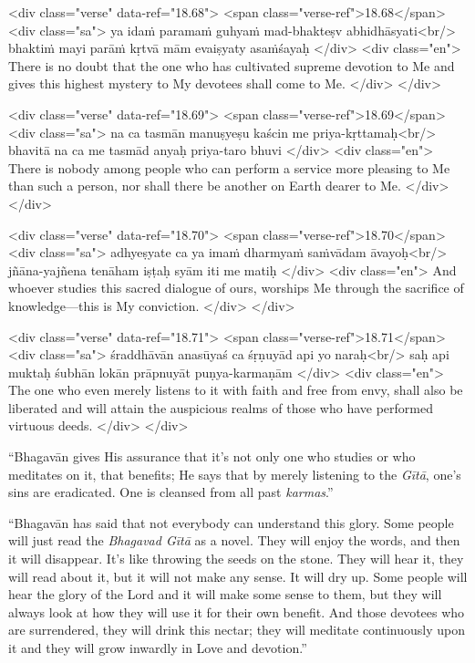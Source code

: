 \begin{html}
<div class="verse" data-ref="18.68">
  <span class="verse-ref">18.68</span>
  <div class="sa">
    ya idaṁ paramaṁ guhyaṁ mad-bhakteṣv abhidhāsyati<br/>
    bhaktiṁ mayi parāṁ kṛtvā mām evaiṣyaty asaṁśayaḥ
  </div>
  <div class="en">
    There is no doubt that the one who has cultivated supreme devotion to Me and gives this highest mystery to My devotees shall come to Me.
  </div>
</div>
\end{html}



\begin{html}
<div class="verse" data-ref="18.69">
  <span class="verse-ref">18.69</span>
  <div class="sa">
    na ca tasmān manuṣyeṣu kaścin me priya-kṛttamaḥ<br/>
    bhavitā na ca me tasmād anyaḥ priya-taro bhuvi
  </div>
  <div class="en">
    There is nobody among people who can perform a service more pleasing to Me than such a person, nor shall there be another on Earth dearer to Me.
  </div>
</div>
\end{html}



\begin{html}
<div class="verse" data-ref="18.70">
  <span class="verse-ref">18.70</span>
  <div class="sa">
    adhyeṣyate ca ya imaṁ dharmyaṁ saṁvādam āvayoḥ<br/>
    jñāna-yajñena tenāham iṣṭaḥ syām iti me matiḥ
  </div>
  <div class="en">
    And whoever studies this sacred dialogue of ours, worships Me through the sacrifice of knowledge---this is My conviction.
  </div>
</div>
\end{html}



\begin{html}
<div class="verse" data-ref="18.71">
  <span class="verse-ref">18.71</span>
  <div class="sa">
    śraddhāvān anasūyaś ca śṛṇuyād api yo naraḥ<br/>
    saḥ api muktaḥ śubhān lokān prāpnuyāt puṇya-karmaṇām
  </div>
  <div class="en">
    The one who even merely listens to it with faith and free from envy, shall also be liberated and will attain the auspicious realms of those who have performed virtuous deeds.
  </div>
</div>
\end{html}


\enquote{Bhagavān gives His assurance that it’s not only one who studies or who meditates on it, that benefits; He says that by merely listening to the \textit{Gītā}, one’s sins are eradicated. One is cleansed from all past \textit{karmas}.}

\enquote{Bhagavān has said that not everybody can understand this glory. Some people will just read the \textit{Bhagavad Gītā} as a novel. They will enjoy the words, and then it will disappear. It’s like throwing the seeds on the stone. They will hear it, they will read about it, but it will not make any sense. It will dry up. Some people will hear the glory of the Lord and it will make some sense to them, but they will always look at how they will use it for their own benefit. And those devotees who are surrendered, they will drink this nectar; they will meditate continuously upon it and they will grow inwardly in Love and devotion.}

